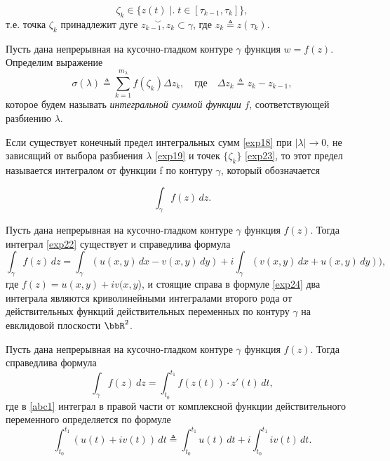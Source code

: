 \begin{equation}
\label{exp23}
\zeta_k \in \{z(t)\; \bigr|\bigl.\; t \in [\tau_{k-1},\tau_k]\},
\end{equation}
т.е. точка $\zeta_k$ принадлежит дуге $\stackrel{\smile}{z_{k-1}, z_k} \subset \gamma$, где $z_k \triangleq z(\tau_k)$.

\begin{defn}
\label{omg}
Пусть дана непрерывная на кусочно-гладком контуре $\gamma$ функция $w=f(z)$. Определим выражение
\begin{equation}
\label{exp18}
\sigma(\lambda) \triangleq \sum\limits_{k=1}^{m_{\lambda}} f(\zeta_k)\Delta z_k, \quad\text{где}\quad \Delta z_k \triangleq z_k - z_{k-1},
\end{equation}
которое будем называть \textit{интегральной суммой функции} $f$, соответствующей разбиению $\lambda$.
\end{defn}

Если существует конечный предел интегральных сумм \eqref{exp18} при $|\lambda| \to 0$, не зависящий от выбора разбиения $\lambda$ \eqref{exp19} и точек $\{\zeta_k\}$ \eqref{exp23}, то этот предел называется интегралом от функции f по контуру $\gamma$, который обозначается

\begin{equation}
\label{exp22}
\int_\gamma f(z)\,dz.
\end{equation}

\begin{thm}
\label{exp21}
Пусть дана непрерывная на кусочно-гладком контуре $\gamma$ функция $f(z)$. Тогда интеграл \eqref{exp22} существует и справедлива формула
\begin{equation}
\label{exp24}
\int _\gamma f(z) \,dz = \int _\gamma(u(x,y)\,dx - v(x,y)\,dy)+i\int_\gamma (v(x,y)\,dx +u(x,y)\,dy)),
\end{equation}
где $f(z) = u(x, y)+ iv(x, y$), и стоящие справа в формуле \eqref{exp24} два интеграла являются криволинейными интегралами второго рода от действительных функций действительных переменных по контуру $\gamma$ на евклидовой плоскости $\bbR^2$.
\end{thm}


\begin{cons}
Пусть дана непрерывная на кусочно-гладком контуре $\gamma$ функция $f(z)$. Тогда справедлива формула 
\begin{equation}
\label{abc1}
\int _\gamma f(z) \,dz = \int _{t_0}^{t_1} f(z(t))\cdot z'(t) \,dt,
\end{equation}
где в \eqref{abc1} интеграл в правой части от комплексной функции действительного переменного определяется по формуле
\begin{equation}
\label{kek2}
\int _{t_0}^{t_1}(u(t)+iv(t)) \,dt \triangleq \int _{t_0}^{t_1}u(t) \,dt + i \int _{t_0}^{t_1}iv(t) \,dt.
\end{equation}
\end{cons}

